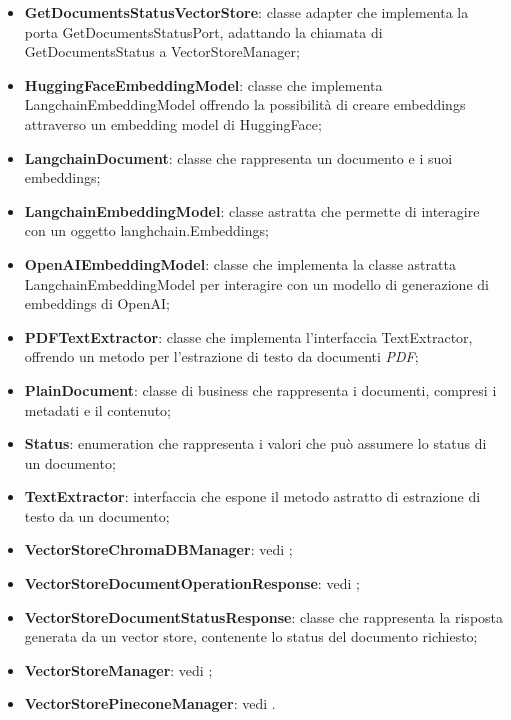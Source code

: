 \documentclass[10pt, a4paper]{article}
\begin{document}
\begin{itemize}
    \item \label{GetDocumentsStatusVectorStore}\textbf{GetDocumentsStatusVectorStore}: classe adapter che implementa la porta GetDocumentsStatusPort, adattando la chiamata di GetDocumentsStatus a VectorStoreManager;
    \item \label{HuggingFaceEmbeddingModel}\textbf{HuggingFaceEmbeddingModel}: classe che implementa LangchainEmbeddingModel offrendo la possibilità di creare embeddings attraverso un embedding model di HuggingFace;
    \item \label{LangchainDocument}\textbf{LangchainDocument}: classe che rappresenta un documento e i suoi embeddings;    
    \item \label{LangchainEmbeddingModel}\textbf{LangchainEmbeddingModel}: classe astratta che permette di interagire con un oggetto langhchain.Embeddings;
    \item \label{OpenAIEmbeddingModel}\textbf{OpenAIEmbeddingModel}: classe che implementa la classe astratta LangchainEmbeddingModel per interagire con un modello di generazione di embeddings di OpenAI;
    \item \label{PDFTextExtractor}\textbf{PDFTextExtractor}: classe che implementa l'interfaccia TextExtractor, offrendo un metodo per l'estrazione di testo da documenti \textit{PDF\pg};
    \item \label{PlainDocument}\textbf{PlainDocument}: classe di business che rappresenta i documenti, compresi i metadati e il contenuto;
    \item \label{Status}\textbf{Status}: enumeration che rappresenta i valori che può assumere lo status di un documento;
    \item \label{TextExtractor}\textbf{TextExtractor}: interfaccia che espone il metodo astratto di estrazione di testo da un documento;   
    \item \textbf{VectorStoreChromaDBManager}: vedi ;
    \item \textbf{VectorStoreDocumentOperationResponse}: vedi ;
    \item \label{VectorStoreDocumentStatusResponse}\textbf{VectorStoreDocumentStatusResponse}: classe che rappresenta la risposta generata da un vector store, contenente lo status del documento richiesto;
    \item \textbf{VectorStoreManager}: vedi ;
    \item \textbf{VectorStorePineconeManager}: vedi .
\end{itemize}
\end{document}
